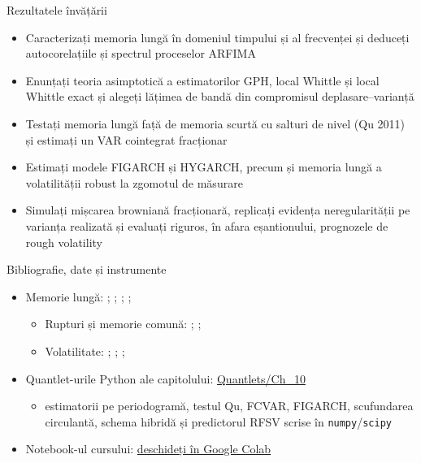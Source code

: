 \begin{frame}{Rezultatele învățării}
\itemsize{\small}
\begin{itemize}
    \item Caracterizați memoria lungă în domeniul timpului și al frecvenței și deduceți autocorelațiile și spectrul proceselor ARFIMA
    \item Enunțați teoria asimptotică a estimatorilor GPH, local Whittle și local Whittle exact și alegeți lățimea de bandă din compromisul deplasare--varianță
    \item Testați memoria lungă față de memoria scurtă cu salturi de nivel (Qu 2011) și estimați un VAR cointegrat fracționar
    \item Estimați modele FIGARCH și HYGARCH, precum și memoria lungă a volatilității robust la zgomotul de măsurare
    \item Simulați mișcarea browniană fracționară, replicați evidența neregularității pe varianța realizată și evaluați riguros, în afara eșantionului, prognozele de rough volatility
\end{itemize}
\end{frame}

\begin{frame}{Bibliografie, date și instrumente}
\itemsize{\small}
\begin{itemize}
    \item Memorie lungă: ; ; ; ; 
    \begin{itemize}
        \item Rupturi și memorie comună: ; ; 
        \item Volatilitate: ; ; ; 
    \end{itemize}
    \item Quantlet-urile Python ale capitolului: \href{https://github.com/danpele/Advanced-Time-Series/tree/main/Quantlets/Ch_10}{Quantlets/Ch\_10}
    \begin{itemize}
        \item estimatorii pe periodogramă, testul Qu, FCVAR, FIGARCH, scufundarea circulantă, schema hibridă și predictorul RFSV scrise în \texttt{numpy}/\texttt{scipy}
    \end{itemize}
    \item Notebook-ul cursului: \href{\colaburl{notebooks/EN/chapter10_lecture_notebook.ipynb}}{deschideți în Google Colab}
\end{itemize}
\end{frame}

